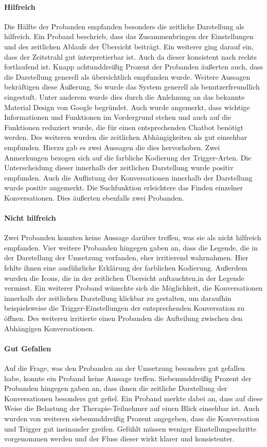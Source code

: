 \paragraph{Hilfreich}Die Hälfte der Probanden empfanden besonders die zeitliche Darstellung als hilfreich. Ein Proband beschrieb, dass das Zusammenbringen der Einstellungen und des zeitlichen Ablaufs der Übersicht beiträgt. Ein weiterer ging darauf ein, dass der Zeitstrahl gut interpretierbar ist. Auch da dieser konsistent nach rechts fortlaufend ist. Knapp achtunddreißig Prozent der Probanden äußerten auch, dass die Darstellung generell als übersichtlich empfunden wurde. Weitere Aussagen bekräftigen diese Äußerung. So wurde das System generell als benutzerfreundlich eingestuft. Unter anderem wurde dies durch die Anlehnung an das bekannte Material Design von Google begründet. Auch wurde angemerkt, dass wichtige Informationen und Funktionen im Vordergrund stehen und auch auf die Funktionen reduziert wurde, die für einen entsprechenden Chatbot benötigt werden. Des weiteren wurden die zeitlichen Abhängigkeiten als gut einsehbar empfunden. Hierzu gab es zwei Aussagen die dies hervorhoben. Zwei Anmerkungen bezogen sich auf die farbliche Kodierung der Trigger-Arten. Die Unterscheidung dieser innerhalb der zeitlichen Darstellung wurde positiv empfunden. Auch die Auflistung der Konversationen innerhalb der Darstellung wurde positiv angemerkt. Die Suchfunktion erleichtere das Finden einzelner Konversationen. Dies äußerten ebenfalls zwei Probanden.


\paragraph{Nicht hilfreich}Zwei Probanden konnten keine Aussage darüber treffen, was sie als nicht hilfreich empfanden. Vier weitere Probanden hingegen gaben an, dass die Legende, die in der Darstellung der Umsetzung vorfanden, eher irritierend wahrnahmen. Hier fehlte ihnen eine ausführliche Erklärung der farblichen Kodierung. Außerdem wurden die Icons, die in der zeitlichen Übersicht auftauchten,in der Legende vermisst. Ein weiterer Proband wünschte sich die Möglichkeit, die Konversationen innerhalb der zeitlichen Darstellung klickbar zu gestalten, um daraufhin beispielsweise die Trigger-Einstellungen der entsprechenden Konversation zu öffnen. Des weiteren irritierte einen Probanden die Aufteilung zwischen den Abhängigen Konversationen.

\paragraph{Gut Gefallen} Auf die Frage, was den Probanden an der Umsetzung besonders gut gefallen habe, konnte ein Proband keine Aussage treffen. Siebenunddreißig Prozent der Probanden hingegen gaben an, dass ihnen die zeitliche Darstellung der Konversationen besonders gut gefiel. Ein Proband merkte dabei an, dass auf diese Weise die Belastung der Therapie-Teilnehmer auf einen Blick  einsehbar ist. Auch wurden von weiteren siebenunddreißig Prozent angegeben, dass die Konversation und Trigger gut ineinander greifen. Gefühlt müssen weniger Einstellungsschritte vorgenommen werden und der Fluss dieser wirkt klarer und konsistenter.

